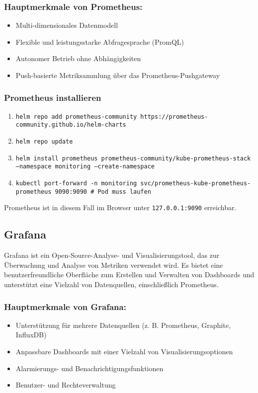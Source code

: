 \subsubsection{Hauptmerkmale von Prometheus:}
\begin{itemize}
  \item Multi-dimensionales Datenmodell
  \item Flexible und leistungsstarke Abfragesprache (PromQL)
  \item Autonomer Betrieb ohne Abhängigkeiten
  \item Push-basierte Metriksammlung über das Prometheus-Pushgateway
\end{itemize}

\subsubsection{Prometheus installieren}
\begin{enumerate}
    \item \texttt{helm repo add prometheus-community https://prometheus-community.github.io/helm-charts}
    \item \texttt{helm repo update}
    \item \texttt{helm install prometheus prometheus-community/kube-prometheus-stack --namespace monitoring --create-namespace}
    \item \texttt{kubectl port-forward -n monitoring svc/prometheus-kube-prometheus-prometheus 9090:9090 \# Pod muss laufen}
\end{enumerate}

Prometheus ist in diesem Fall im Browser unter \texttt{127.0.0.1:9090} erreichbar.

\subsection{Grafana}
Grafana ist ein Open-Source-Analyse- und Visualisierungstool, das zur Überwachung und Analyse von Metriken verwendet wird. Es bietet eine benutzerfreundliche Oberfläche zum Erstellen und Verwalten von Dashboards und unterstützt eine Vielzahl von Datenquellen, einschließlich Prometheus.

\subsubsection{Hauptmerkmale von Grafana:}
\begin{itemize}
  \item Unterstützung für mehrere Datenquellen (z. B. Prometheus, Graphite, InfluxDB)
  \item Anpassbare Dashboards mit einer Vielzahl von Visualisierungsoptionen
  \item Alarmierungs- und Benachrichtigungsfunktionen
  \item Benutzer- und Rechteverwaltung
\end{itemize}

